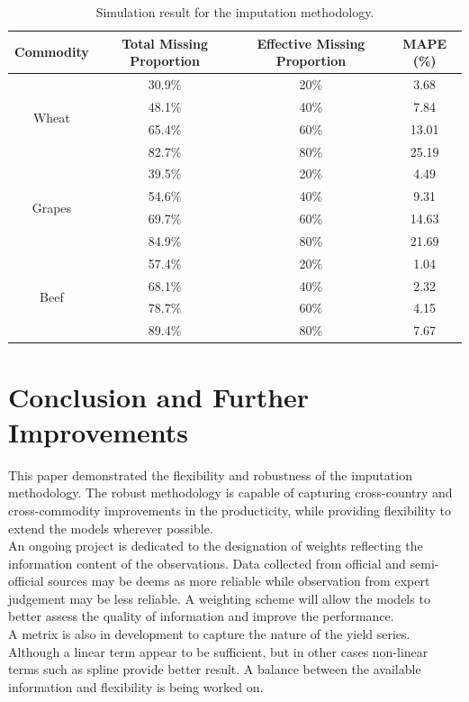 \documentclass[nojss]{jss}\usepackage[]{graphicx}\usepackage[]{color}
\begin{document}
\begin{table}
  \centering
  \label{tab:simResult}
  \caption{Simulation result for the imputation methodology.}  
  \begin{tabular}{|c|c|c|c|}
    \hline
    Commodity & Total Missing Proportion & Effective Missing Proportion & MAPE (\%)\\
    \hline \hline
    \multirow{4}{*}{Wheat}
      &30.9\%  & 20\% & 3.68\\
      &48.1\%  & 40\% & 7.84\\
      &65.4\%  & 60\% & 13.01\\
      &82.7\%  & 80\% & 25.19\\
    \hline
    \multirow{4}{*}{Grapes}
      &39.5\%  & 20\% & 4.49\\
      &54.6\%  & 40\% & 9.31\\
      &69.7\%  & 60\% & 14.63\\
      &84.9\%  & 80\% & 21.69\\
    \hline
    \multirow{4}{*}{Beef}
      &57.4\%  & 20\% & 1.04\\
      &68.1\%  & 40\% & 2.32\\
      &78.7\%  & 60\% & 4.15\\
      &89.4\%  & 80\% & 7.67\\
    \hline 
  \end{tabular}
\end{table}


\FloatBarrier
\section{Conclusion and Further Improvements}
This paper demonstrated the flexibility and robustness of the
imputation methodology. The robust methodology is capable of capturing
cross-country and cross-commodity improvements in the producticity,
while providing flexibility to extend the models wherever possible.\\

An ongoing project is dedicated to the designation of weights
reflecting the information content of the observations. Data collected
from official and semi-official sources may be deems as more reliable
while observation from expert judgement may be less reliable. A
weighting scheme will allow the models to better assess the quality of
information and improve the performance.\\

A metrix is also in development to capture the nature of the yield
series. Although a linear term appear to be sufficient, but in other
cases non-linear terms such as spline provide better result. A balance
between the available information and flexibility is being worked on.\\
\end{document}
